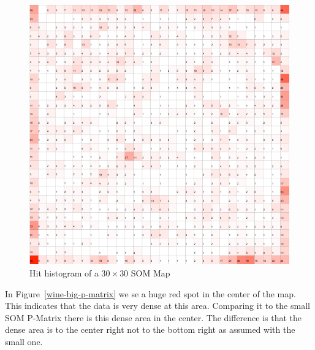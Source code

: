 \documentclass{acm_proc_article-sp}
\begin{document}
\begin{figure}
\centering
\includegraphics[width=\linewidth]{img/wine-big-hit-histogram}
\caption{Hit histogram of a $30\times30$ SOM Map}
\label{fig:wine-big-hit-histogram}
\end{figure}

In Figure~\ref{wine-big-p-matrix} we se a huge red spot in the center of the map. This indicates that
the data is very dense at this area. Comparing it to the small SOM P-Matrix there is this dense area
in the center. The difference is that the dense area is to the center right not to the bottom right as assumed with
the small one.
\end{document}
